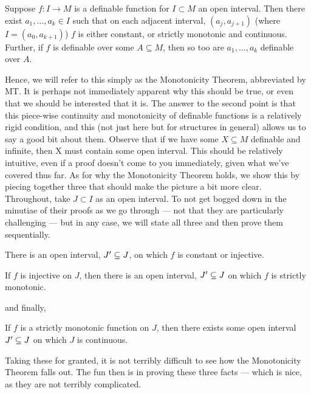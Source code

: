 \begin{theorem}
	\label{thm:monotonicity}
  Suppose $f \colon I \to M$ is a definable function for $I \subset M$ an open interval. Then there exist $a_1, \hdots, a_k \in I$ such that on each adjacent interval, $(a_j, a_{j+1})$ (where $I = (a_0, a_{k+1})$) $f$ is either constant, or strictly monotonic and continuous. Further, if $f$ is definable over some $A \subseteq M$, then so too are $a_1, \hdots, a_{k}$ definable over $A$.
\end{theorem}

Hence, we will refer to this simply as the Monotonicity Theorem, abbreviated by MT. It is perhaps not immediately apparent why this should be true, or even that we should be interested that it is. The answer to the second point is that this piece-wise continuity and monotonicity of definable functions is a relatively rigid condition, and this (not just here but for structures in general) allows us to say a good bit about them. Observe that if we have some $X \subseteq M$ definable and infinite, then X must contain some open interval. This should be relatively intuitive, even if a proof doesn't come to you immediately, given what we've covered thus far. As for why the Monotonicity Theorem holds, we show this by piecing together three \lemmas that should make the picture a bit more clear. Throughout, take $J \subset I$ as an open interval. To not get bogged down in the minutiae of their proofs as we go through — not that they are particularly challenging — but in any case, we will state all three and then prove them sequentially.

\begin{lemma}
\label{lemma:monotonic-1}
  There is an open interval, $J^{\prime} \subseteq J$, on which $f$ is constant or injective.
\end{lemma}

\begin{lemma}
\label{lemma:monotonic-2}
  If $f$ is injective on $J$, then there is an open interval, $J^{\prime} \subseteq J$ on which $f$ is strictly monotonic.
\end{lemma}

and finally,

\begin{lemma}
\label{lemma:monotonic-3}
  If $f$ is a strictly monotonic function on $J$, then there exists some open interval $ J^{\prime} \subseteq J$ on which $J$ is continuous.
\end{lemma}

Taking these \lemmas for granted, it is not terribly difficult to see how the Monotonicity Theorem falls out. The fun then is in proving these three facts — which is nice, as they are not terribly complicated.


